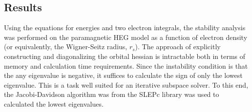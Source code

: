 \documentclass[preprint, journal=prl]{revtex4-1}
\begin{document}
\subsection{Results}   
  Using the equations for energies and two electron integrals, the stability analysis was performed on the paramagnetic HEG model as a function of electron density (or equivalently, the Wigner-Seitz radius, $r_s$). The approach of explicitly constructing and diagonalizing the orbital hessian is intractable both in terms of memory and calculation time requirements. Since the instability condition is that the any eigenvalue is negative, it suffices to calculate the sign of only the lowest eigenvalue. This is a task well suited for an iterative subspace solver. To this end, the Jacobi-Davidson algorithm was from the SLEPc library was used to calculated the lowest eigenvalues\cite{Hernandez2005}. 
  
\end{document}
